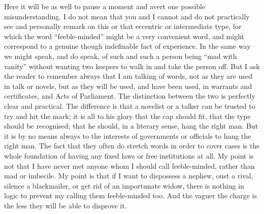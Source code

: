 \documentclass{book}
\begin{document}
Here it will be as well to pause a moment and avert one possible misunderstanding. I do not mean that you and I cannot and do not practically see and personally remark on this or that eccentric or intermediate type, for which the word “feeble-minded” might be a very convenient word, and might correspond to a genuine though indefinable fact of experience. In the same way we might speak, and do speak, of such and such a person being “mad with vanity” without wanting two keepers to walk in and take the person off. But I ask the reader to remember always that I am talking of words, not as they are used in talk or novels, but as they will be used, and have been used, in warrants and certificates, and Acts of Parliament. The distinction between the two is perfectly clear and practical. The difference is that a novelist or a talker can be trusted to try and hit the mark; it is all to his glory that the cap should fit, that the type should be recognised; that he should, in a literary sense, hang the right man. But it is by no means always to the interests of governments or officials to hang the right man. The fact that they often do stretch words in order to cover cases is the whole foundation of having any fixed laws or free institutions at all. My point is not that I have never met anyone whom I should call feeble-minded, rather than mad or imbecile. My point is that if I want to dispossess a nephew, oust a rival, silence a blackmailer, or get rid of an importunate widow, there is nothing in logic to prevent my calling them feeble-minded too. And the vaguer the charge is the less they will be able to disprove it.
\end{document}

